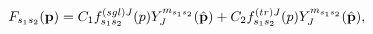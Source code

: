 \begin{equation}
F_{s_{1}s_{2}}(\mathbf{p})=C_{1}f_{s_{1}s_{2}}^{\left( sgl\right)
J}(p)Y_{J}^{m_{s_{1}s_{2}}}(\hat{\mathbf{p}})+C_{2}f_{s_{1}s_{2}}^{%
\left( tr\right) J}(p)Y_{J}^{m_{s_{1}s_{2}}}(\hat{\mathbf{p}}),
\end{equation}


